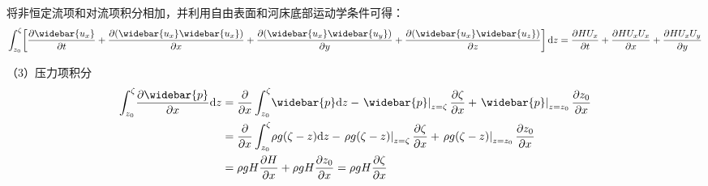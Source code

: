 将非恒定流项和对流项积分相加，并利用自由表面和河床底部运动学条件可得：
\begin{equation}
    \int_{z_{0}}^{\zeta}\!
    \left[
  \frac{\partial \widebar{u_{x}}}{\partial t} +
  \frac{\partial (\widebar{u_{x}}\widebar{u_{x}})}{\partial x} +
  \frac{\partial (\widebar{u_{x}}\widebar{u_{y}})}{\partial y} +
  \frac{\partial (\widebar{u_{x}}\widebar{u_{z}})}{\partial z}
  \right]
  \mathrm{d}z
=
\frac{\partial HU_{x}}{\partial t}
+
\frac{\partial HU_{x}U_{x}}{\partial x}
+
\frac{\partial HU_{x}U_{y}}{\partial y}
\end{equation}

（3）压力项积分
\begin{equation}
  \begin{aligned}
    \int_{z_{0}}^{\zeta}\!
    \frac{\partial \widebar{p}}{\partial x}
    \mathrm{d}z
    &=
    \frac{\partial}{\partial x}
    \int_{z_0}^{\zeta}\!
    \widebar{p}
    \mathrm{d}z
    -
    \left.\widebar{p}\right|_{z=\zeta}\frac{\partial \zeta}{\partial x}
    +
    \left.\widebar{p}\right|_{z=z_{0}}\frac{\partial z_{0}}{\partial x}
      \\
    &=
    \frac{\partial}{\partial x}
    \int_{z_0}^{\zeta}\!
    \rho g(\zeta-z)
    \mathrm{d}z
    -
    \left.\rho g(\zeta-z)\right|_{z=\zeta}\frac{\partial \zeta}{\partial x}
    +
    \left.\rho g(\zeta-z)\right|_{z=z_{0}}\frac{\partial z_{0}}{\partial x}
      \\
    &=
    \rho gH\frac{\partial H}{\partial x} 
    +
    \rho gH\frac{\partial z_{0}}{\partial x} 
    =
    \rho gH\frac{\partial \zeta}{\partial x} 
  \end{aligned}
\end{equation}

